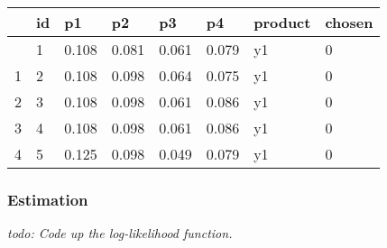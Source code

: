 \documentclass[
  letterpaper,
  DIV=11,
  numbers=noendperiod]{scrartcl}
\begin{document}
\begin{longtable}[]{@{}llllllll@{}}
\toprule\noalign{}
& id & p1 & p2 & p3 & p4 & product & chosen \\
\midrule\noalign{}
\endhead
\bottomrule\noalign{}
\endlastfoot
0 & 1 & 0.108 & 0.081 & 0.061 & 0.079 & y1 & 0 \\
1 & 2 & 0.108 & 0.098 & 0.064 & 0.075 & y1 & 0 \\
2 & 3 & 0.108 & 0.098 & 0.061 & 0.086 & y1 & 0 \\
3 & 4 & 0.108 & 0.098 & 0.061 & 0.086 & y1 & 0 \\
4 & 5 & 0.125 & 0.098 & 0.049 & 0.079 & y1 & 0 \\
\end{longtable}

\subsubsection{Estimation}\label{estimation}

\emph{todo: Code up the log-likelihood function.}
\end{document}
